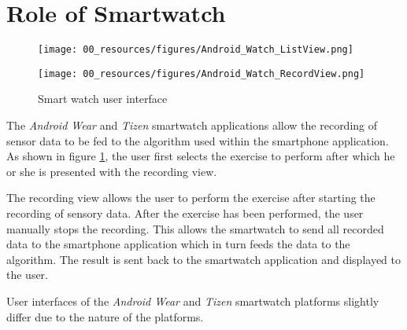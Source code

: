 \section{Role of Smartwatch}

\begin{figure}[b!]
  \centering
    \begin{minipage}{0.20\textwidth}
      \centering
        \texttt{[image: 00\_resources/figures/Android\_Watch\_ListView.png]}
    \end{minipage}
    \begin{minipage}{0.20\textwidth}
      \centering
        \texttt{[image: 00\_resources/figures/Android\_Watch\_RecordView.png]}
    \end{minipage}
  \caption{Smart watch user interface}
  \label{fig:smwui}
\end{figure}

The \textit{Android Wear} and \textit{Tizen} smartwatch applications allow the
recording of sensor data to be fed to the algorithm used within the
smartphone application. As shown in figure \ref{fig:smwui}, the user first
selects the exercise to perform after which he or she is presented with the
recording view.

The recording view allows the user to perform the exercise after starting the
recording of sensory data. After the exercise has been performed, the user
manually stops the recording. This allows the smartwatch to send all recorded
data to the smartphone application which in turn feeds the data to the
algorithm. The result is sent back to the smartwatch application and displayed
to the user.

User interfaces of the \textit{Android Wear} and \textit{Tizen} smartwatch
platforms slightly differ due to the nature of the platforms.

